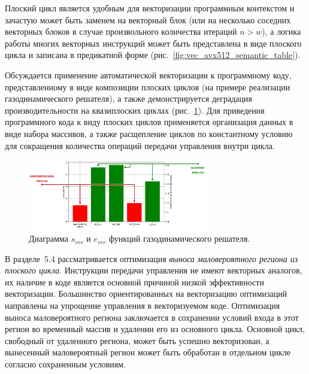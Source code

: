 \documentclass[a4paper,14pt]{extarticle}                     %
\theoremstyle{plain}                                         %
\begin{document}
Плоский цикл является удобным для векторизации программным контекстом и зачастую может быть заменем на векторный блок (или на несколько соседних векторных блоков в случае произвольного количества итераций $n > w$), а логика работы многих векторных инструкций может быть представлена в виде плоского цикла и записана в предикатной форме (рис.~\ref{fig:vec_avx512_semantic_table}).

Обсуждается применение автоматической векторизации к программному коду, представленному в виде композиции плоских циклов (на примере реализации газодинамического решателя), а также демонстрируется деградация производительности на квазиплоских циклах (рис.~\ref{fig:vec_diagram_ibm_functions}).
Для приведения программного кода к виду плоских циклов применяется организация данных в виде набора массивов, а также расщепление циклов по константному условию для сокращения количества операций передачи управления внутри цикла.

\begin{figure}[!ht]
\centering
\includegraphics[width=0.7\textwidth]{./fig/vec_diagram_ibm_functions.pdf}
\singlespacing
\caption{Диаграмма $s_{vec}$ и $e_{vec}$ функций газодинамического решателя.}
\label{fig:vec_diagram_ibm_functions}
\end{figure}


В разделе~5.4 рассматривается оптимизация \textit{выноса маловероятного региона из плоского цикла}.
Инструкции передачи управления не имеют векторных аналогов, их наличие в коде является основной причиной низкой эффективности векторизации.
Большинство ориентированных на векторизацию оптимизаций направлены на упрощение управления в векторизуемом коде. 
Оптимизация выноса маловероятного региона заключается в сохранении условий входа в этот регион во временный массив и удалении его из основного цикла.
Основной цикл, свободный от удаленного региона, может быть успешно векторизован, а вынесенный маловероятный регион может быть обработан в отдельном цикле согласно сохраненным условиям.

\end{document}
